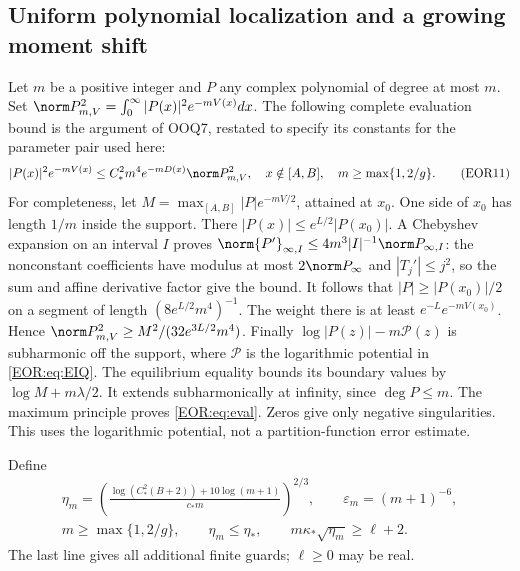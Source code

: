 \documentclass[11pt,a4paper]{article}
\begin{document}
\subsection{Uniform polynomial localization and a growing moment shift}
\label{EOR:sec:localization}
Let $m$ be a positive integer and $P$ any complex polynomial of degree at most $m$.
Set $\norm P_{m,V}^2=\int_0^\infty|P(x)|^2e^{-mV(x)}dx$.
The following complete evaluation bound is the argument of OOQ7, restated to
specify its constants for the parameter pair used here:
\begin{equation}
 |P(x)|^2e^{-mV(x)}\le C_*^2m^4e^{-mD(x)}\norm P_{m,V}^2,
 \quad x\notin[A,B],\quad m\ge\max\{1,2/g\}.
 \label{EOR:eq:eval}
\tag{EOR11}
\end{equation}
For completeness, let $M=\max_{[A,B]}|P|e^{-mV/2}$, attained at $x_0$.
One side of $x_0$ has length $1/m$ inside the support. There
$|P(x)|\le e^{L/2}|P(x_0)|$.
A Chebyshev expansion on an interval $I$ proves
$\norm{P'}_{\infty,I}\le4m^3|I|^{-1}\norm P_{\infty,I}$:
the nonconstant coefficients have modulus at most $2\norm P_\infty$ and
$|T_j'|\le j^2$, so the sum and affine derivative factor give the bound.
It follows that $|P|\ge|P(x_0)|/2$ on a segment of length
$(8e^{L/2}m^4)^{-1}$. The weight there is at least $e^{-L}e^{-mV(x_0)}$.
Hence $\norm P_{m,V}^2\ge M^2/(32e^{3L/2}m^4)$.
Finally $\log|P(z)|-m\mathcal P(z)$ is subharmonic off the support,
where $\mathcal P$ is the logarithmic potential in \eqref{EOR:eq:EIQ}.
The equilibrium equality bounds its boundary values by $\log M+m\lambda/2$.
It extends subharmonically at infinity, since $\deg P\le m$.
The maximum principle proves \eqref{EOR:eq:eval}. Zeros give only negative singularities.
This uses the logarithmic potential, not a partition-function error estimate.

Define
\begin{equation}
\begin{gathered}
 \eta_m=\left(
 \frac{\log(C_*^2(B+2))+10\log(m+1)}{c_*m}
 \right)^{2/3},\qquad \varepsilon_m=(m+1)^{-6},\\
 m\ge\max\{1,2/g\},\qquad
 \eta_m\le\eta_*,\qquad
 m\kappa_*\sqrt{\eta_m}\ge\ell+2 .
\end{gathered}\label{EOR:eq:guards}
\tag{EOR12}
\end{equation}
The last line gives all additional finite guards; $\ell\ge0$ may be real.
\end{document}
